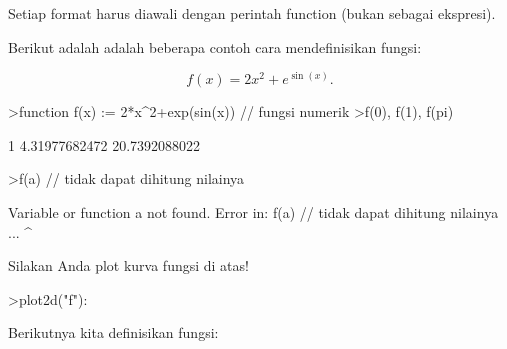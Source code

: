 \documentclass[12pt,arial,letterpaper]{book}
\begin{document}
\begin{eulercomment}
\begin{eulercomment}
\begin{eulercomment}
\begin{eulercomment}
\begin{eulercomment}
\begin{eulercomment}
\begin{eulercomment}
\begin{eulercomment}
\begin{eulercomment}
\begin{eulercomment}
\begin{eulercomment}
\begin{eulercomment}
\begin{eulercomment}
\begin{eulercomment}
\begin{eulercomment}
\begin{eulercomment}
\begin{eulercomment}
\begin{eulercomment}
\begin{eulercomment}
Setiap format harus diawali dengan perintah function (bukan sebagai
ekspresi).

Berikut adalah adalah beberapa contoh cara mendefinisikan fungsi:

\end{eulercomment}
\begin{eulerformula}
\[
f(x)=2x^2+e^{\sin(x)}.
\]
\end{eulerformula}
\begin{eulerprompt}
>function f(x) := 2*x^2+exp(sin(x)) // fungsi numerik
>f(0), f(1), f(pi)
\end{eulerprompt}
\begin{euleroutput}
  1
  4.31977682472
  20.7392088022
\end{euleroutput}
\begin{eulerprompt}
>f(a) // tidak dapat dihitung nilainya
\end{eulerprompt}
\begin{euleroutput}
  Variable or function a not found.
  Error in:
  f(a) // tidak dapat dihitung nilainya ...
     ^
\end{euleroutput}
\begin{eulercomment}
Silakan Anda plot kurva fungsi di atas!

\end{eulercomment}
\begin{eulerprompt}
>plot2d("f"):
\end{eulerprompt}
\begin{eulercomment}
Berikutnya kita definisikan fungsi:


\end{eulercomment}
\end{eulercomment}
\end{eulercomment}
\end{eulercomment}
\end{eulercomment}
\end{eulercomment}
\end{eulercomment}
\end{eulercomment}
\end{eulercomment}
\end{eulercomment}
\end{eulercomment}
\end{eulercomment}
\end{eulercomment}
\end{eulercomment}
\end{eulercomment}
\end{eulercomment}
\end{eulercomment}
\end{eulercomment}
\end{eulercomment}
\end{document}
